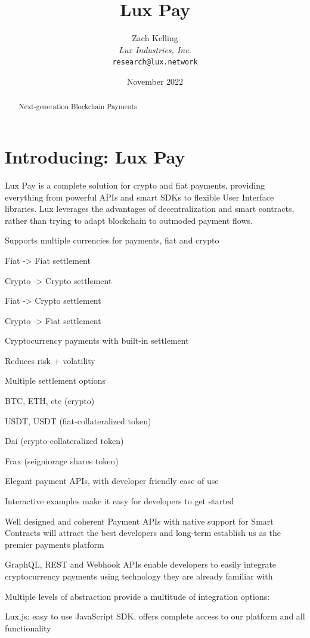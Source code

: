 \documentclass[11pt]{article}
\title{Lux Pay}
\author{Zach Kelling\\\textit{Lux Industries, Inc.}\\\texttt{research@lux.network}}
\date{November 2022}
\begin{document}
\luxcoverpage

\begin{abstract}
Next-generation Blockchain Payments
\end{abstract}

\tableofcontents
\newpage


\section{Introducing: Lux Pay}

Lux Pay is a complete solution for crypto and fiat payments, providing everything from powerful APIs and smart SDKs to flexible User Interface libraries. Lux leverages the advantages of decentralization and smart contracts, rather than trying to adapt blockchain to outmoded payment flows.


Supports multiple currencies for payments, fiat and crypto


Fiat -> Fiat settlement


Crypto -> Crypto settlement


Fiat -> Crypto settlement


Crypto -> Fiat settlement


Cryptocurrency payments with built-in settlement


Reduces risk + volatility


Multiple settlement options


BTC, ETH, etc (crypto)


USDT, USDT (fiat-collateralized token)


Dai (crypto-collateralized token)


Frax (seigniorage shares token)


Elegant payment APIs, with developer friendly ease of use


Interactive examples make it easy for developers to get started


Well designed and coherent Payment APIs with native support for Smart Contracts will attract the best developers and long-term establish us as the premier payments platform


GraphQL, REST and Webhook APIs enable developers to easily integrate cryptocurrency payments using technology they are already familiar with


Multiple levels of abstraction provide a multitude of integration options:


Lux.js: easy to use JavaScript SDK, offers complete access to our platform and all functionality
\end{document}
